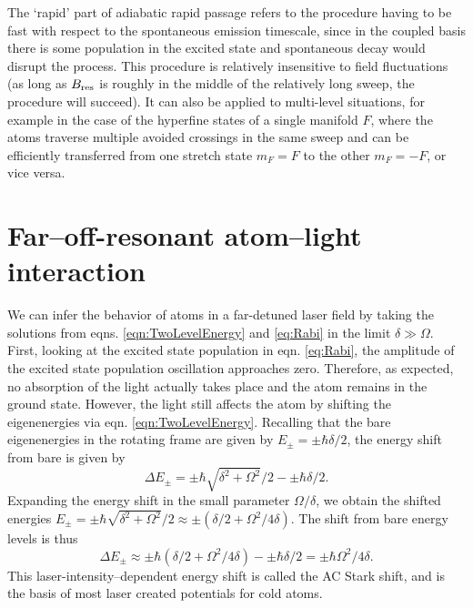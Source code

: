 The \lq{rapid}\rq{} part of adiabatic rapid passage refers to the procedure having to be fast with respect to the spontaneous emission timescale, since in the coupled basis there is some population in the excited state and spontaneous decay would disrupt the process. This procedure is relatively insensitive to field fluctuations (as long as $B_{\rm res}$ is roughly in the middle of the relatively long sweep, the procedure will succeed). It can also be applied to multi-level situations, for example in the case of the hyperfine states of a single manifold $F$, where the atoms traverse multiple avoided crossings in the same sweep and can be efficiently transferred from one stretch state $m_F=F$ to the other $m_F=-F$, or vice versa. 



\section{Far--off-resonant atom--light interaction}\label{sec:FoRatomLight}

	We can infer the behavior of atoms in a far-detuned laser field by taking the solutions from eqns. \ref{eqn:TwoLevelEnergy} and \ref{eq:Rabi} in the limit $\delta \gg \Omega$. First, looking at the excited state population in eqn. \ref{eq:Rabi}, the amplitude of the excited state population oscillation approaches zero. Therefore, as expected, no absorption of the light actually takes place and the atom remains in the ground state. 
	However, the light still affects the atom by shifting the eigenenergies via eqn. \ref{eqn:TwoLevelEnergy}. Recalling that the bare eigenenergies in the rotating frame are given by $E_{\pm}=\pm \hbar\delta/2$, the energy shift from bare is given by
\begin{equation}
\Delta E_{\pm} = \pm\hbar\sqrt{\delta^2+\Omega^2}/2 -\pm \hbar\delta/2.
\end{equation}
Expanding the energy shift in the small parameter $\Omega/\delta$, we obtain the shifted energies $E_{\pm} = \pm \hbar \sqrt{\delta^2 + \Omega^2}/2 \approx \pm (\delta/2 + \Omega^2/4\delta)$. The shift from bare energy levels is thus 
\begin{equation}
\Delta E_{\pm} \approx \pm \hbar(\delta/2 + \Omega^2/4\delta)-\pm \hbar\delta/2 = \pm \hbar \Omega^2/4\delta.
\end{equation}
This laser-intensity--dependent energy shift is called the AC Stark shift, and is the basis of most laser created potentials for cold atoms. 
	
